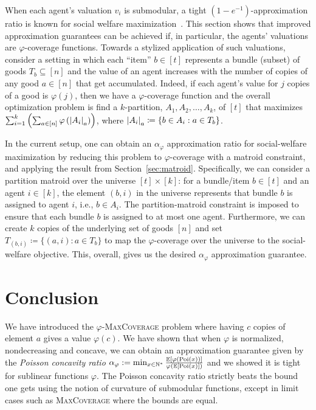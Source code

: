 When each agent's valuation $v_i$ is submodular, a tight $(1- e^{-1})$-approximation ratio is known for social welfare maximization~\cite{Vondrak07}. This section shows that improved approximation guarantees can be achieved if, in particular, the agents' valuations are $\varphi$-coverage functions. Towards a stylized application of such valuations, consider a setting in which each ``item'' $b \in [t]$ represents a bundle (subset) of goods $T_b \subseteq [n]$ and the value of an agent increases with the number of copies of any good $a \in [n]$ that get accumulated. Indeed, if each agent's value for $j$ copies of a good is $\varphi(j)$, then we have a $\varphi$-coverage function and the overall optimization problem is find a $k$-partition, $A_1, A_2, \ldots, A_k$, of $[t]$ that maximizes $\sum_{i=1}^k  \left( \sum_{a \in [n]} \varphi \left(\abs{A_i}_a \right) \right)$, where $ \abs{A_i}_a \coloneqq \{ b \in A_i : a \in T_b \}$. 

In the current setup, one can obtain an $\alpha_\varphi$ approximation ratio for social-welfare maximization by reducing this problem to $\varphi$-coverage with a matroid constraint, and applying the result from Section~\ref{sec:matroid}. Specifically, we can consider a partition matroid over the universe $[t] \times [k]$: for a bundle/item $b \in [t]$ and an agent $i \in [k]$, the element $(b,i)$ in the universe represents that bundle $b$ is assigned to agent $i$, i.e., $b \in A_i$. The partition-matroid constraint is imposed to ensure that each bundle $b$ is assigned to at most one agent. Furthermore, we can create $k$ copies of the underlying set of goods $[n]$ and set $T_{(b,i)} \coloneqq \{ (a, i) : a \in T_b \}$ to map the $\varphi$-coverage over the universe to the social-welfare objective. This, overall, gives us the desired  $\alpha_\varphi$ approximation guarantee.


\section{Conclusion}
We have introduced the $\varphi$-\textsc{MaxCoverage} problem where having $c$ copies of element $a$ gives a value $\varphi(c)$. We have shown that when $\varphi$ is normalized, nondecreasing and concave, we can obtain an approximation guarantee given by the \emph{Poisson concavity ratio} $\alpha_{\varphi} := \min_{x \in \mathbb{N}^*} \frac{\mathbb{E}[\varphi(\operatorname{\text{Poi}}(x))]}{\varphi(\mathbb{E}[\operatorname{\text{Poi}}(x)])}$ and we showed it is tight for sublinear functions $\varphi$. The Poisson concavity ratio strictly beats the bound one gets using the notion of curvature of submodular functions, except in limit cases such as \textsc{MaxCoverage} where the bounds are equal.

